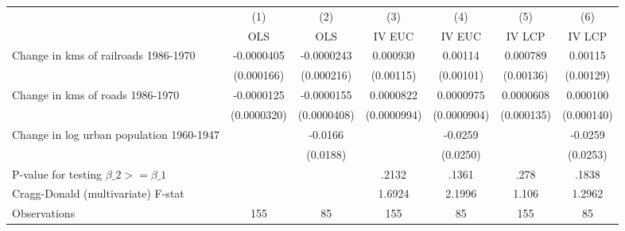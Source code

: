 {
\def\sym#1{\ifmmode^{#1}\else\(^{#1}\)\fi}
\begin{tabular}{l*{6}{c}}
\hline\hline
                &\multicolumn{1}{c}{(1)}&\multicolumn{1}{c}{(2)}&\multicolumn{1}{c}{(3)}&\multicolumn{1}{c}{(4)}&\multicolumn{1}{c}{(5)}&\multicolumn{1}{c}{(6)}\\
                &\multicolumn{1}{c}{OLS}&\multicolumn{1}{c}{OLS}&\multicolumn{1}{c}{IV EUC}&\multicolumn{1}{c}{IV EUC}&\multicolumn{1}{c}{IV LCP}&\multicolumn{1}{c}{IV LCP}\\
\hline
Change in kms of railroads 1986-1970&-0.0000405         &-0.0000243         & 0.000930         &  0.00114         & 0.000789         &  0.00115         \\
                &(0.000166)         &(0.000216)         &(0.00115)         &(0.00101)         &(0.00136)         &(0.00129)         \\
[1em]
Change in kms of roads 1986-1970&-0.0000125         &-0.0000155         &0.0000822         &0.0000975         &0.0000608         & 0.000100         \\
                &(0.0000320)         &(0.0000408)         &(0.0000994)         &(0.0000904)         &(0.000135)         &(0.000140)         \\
[1em]
Change in log urban population 1960-1947&                  &  -0.0166         &                  &  -0.0259         &                  &  -0.0259         \\
                &                  & (0.0188)         &                  & (0.0250)         &                  & (0.0253)         \\
\hline
P-value for testing $\beta\_{2} >= \beta\_{1}$&                  &                  &    .2132         &    .1361         &     .278         &    .1838         \\
Cragg-Donald (multivariate) F-stat&                  &                  &   1.6924         &   2.1996         &    1.106         &   1.2962         \\
Observations    &      155         &       85         &      155         &       85         &      155         &       85         \\
\hline\hline
\end{tabular}
}
